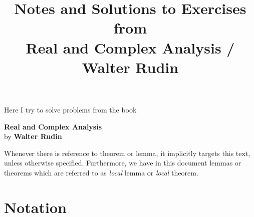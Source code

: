 

\newcommand{\unfinished}{\par\textbf{Unfinished !!!!!!!!!!!!!}}

\usepackage{subfig}
\usepackage[metapost]{mfpic}


\title{Notes and Solutions to Exercises \\
          from \\
       Real and Complex Analysis / Walter Rudin}



\maketitle
\newpage
\tableofcontents
\newpage


\maketitle

\setcounter{chapter}{-2}

Here I try to solve problems
from the book \cite{RudinRCA80}
\begin{center}
\textbf{Real and Complex Analysis}\\
by
\textbf{Walter Rudin}

Whenever there is reference to theorem or lemma, it implicitly
targets this text, unless otherwise specified.
Furthermore, we have in this document lemmas or theorems
which are referred to as \emph{local} lemma
or \emph{local} theorem.
\end{center}

\section*{Notation}

